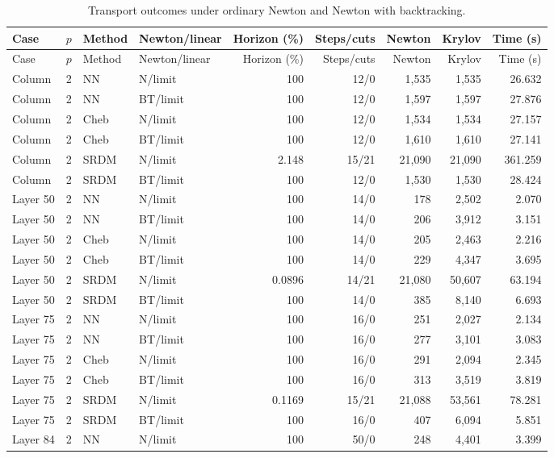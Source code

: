 {\scriptsize\setlength{\tabcolsep}{3pt}
\begin{longtable}{lrllrrrrr}
\caption{Transport outcomes under ordinary Newton and Newton with backtracking.}\label{tab:si-current-matrix}\\
Case & $p$ & Method & Newton/linear & Horizon (\%) & Steps/cuts & Newton & Krylov & Time (s)\\\hline
\endfirsthead
Case & $p$ & Method & Newton/linear & Horizon (\%) & Steps/cuts & Newton & Krylov & Time (s)\\\hline
\endhead
Column & 2 & NN & N/limit & 100 & 12/0 & 1,535 & 1,535 & 26.632 \\
Column & 2 & NN & BT/limit & 100 & 12/0 & 1,597 & 1,597 & 27.876 \\
Column & 2 & Cheb & N/limit & 100 & 12/0 & 1,534 & 1,534 & 27.157 \\
Column & 2 & Cheb & BT/limit & 100 & 12/0 & 1,610 & 1,610 & 27.141 \\
Column & 2 & SRDM & N/limit & 2.148 & 15/21 & 21,090 & 21,090 & 361.259 \\
Column & 2 & SRDM & BT/limit & 100 & 12/0 & 1,530 & 1,530 & 28.424 \\
Layer 50 & 2 & NN & N/limit & 100 & 14/0 & 178 & 2,502 & 2.070 \\
Layer 50 & 2 & NN & BT/limit & 100 & 14/0 & 206 & 3,912 & 3.151 \\
Layer 50 & 2 & Cheb & N/limit & 100 & 14/0 & 205 & 2,463 & 2.216 \\
Layer 50 & 2 & Cheb & BT/limit & 100 & 14/0 & 229 & 4,347 & 3.695 \\
Layer 50 & 2 & SRDM & N/limit & 0.0896 & 14/21 & 21,080 & 50,607 & 63.194 \\
Layer 50 & 2 & SRDM & BT/limit & 100 & 14/0 & 385 & 8,140 & 6.693 \\
Layer 75 & 2 & NN & N/limit & 100 & 16/0 & 251 & 2,027 & 2.134 \\
Layer 75 & 2 & NN & BT/limit & 100 & 16/0 & 277 & 3,101 & 3.083 \\
Layer 75 & 2 & Cheb & N/limit & 100 & 16/0 & 291 & 2,094 & 2.345 \\
Layer 75 & 2 & Cheb & BT/limit & 100 & 16/0 & 313 & 3,519 & 3.819 \\
Layer 75 & 2 & SRDM & N/limit & 0.1169 & 15/21 & 21,088 & 53,561 & 78.281 \\
Layer 75 & 2 & SRDM & BT/limit & 100 & 16/0 & 407 & 6,094 & 5.851 \\
Layer 84 & 2 & NN & N/limit & 100 & 50/0 & 248 & 4,401 & 3.399 \\

\end{longtable}}
